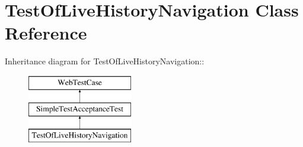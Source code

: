 \hypertarget{class_test_of_live_history_navigation}{
\section{TestOfLiveHistoryNavigation Class Reference}
\label{class_test_of_live_history_navigation}
}
Inheritance diagram for TestOfLiveHistoryNavigation::\begin{figure}[H]
\begin{center}
\leavevmode
\includegraphics[height=3cm]{class_test_of_live_history_navigation}
\end{center}
\end{figure}
